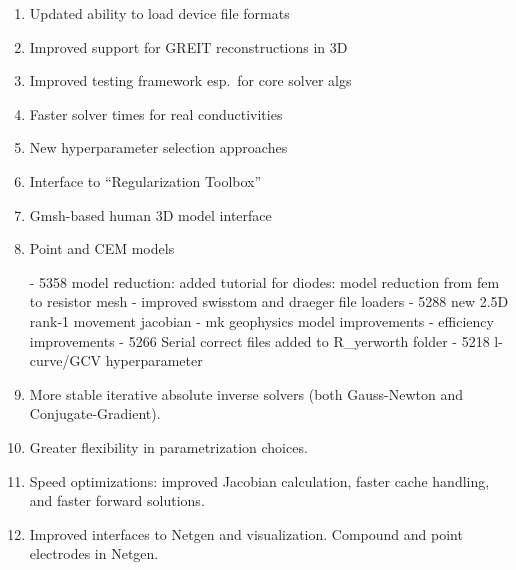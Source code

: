 \documentclass[10pt,a4paper]{article}
\begin{document}
\begin{multicols}{2}
\begin{enumerate}
\item Updated ability to load device file formats

\item Improved support for GREIT reconstructions in 3D

\item Improved testing framework esp.\ for core solver algs

\item Faster solver times for real conductivities

\item New hyperparameter selection approaches

\item Interface to ``Regularization Toolbox'' \cite{Hansen}

\item Gmsh-based human 3D model interface

\item Point and CEM models

  - 5358 model reduction: added tutorial for diodes: model reduction from fem to resistor mesh
  - improved swisstom and draeger file loaders
  - 5288 new 2.5D rank-1 movement jacobian
  - mk geophysics model improvements
  - efficiency improvements
  - 5266 Serial correct files added to R_yerworth folder
  - 5218 l-curve/GCV hyperparameter

\item More stable
  iterative absolute inverse solvers (both Gauss-Newton and
  Conjugate-Gradient).

\item Greater flexibility in parametrization choices.


\item Speed optimizations: improved Jacobian calculation, faster cache handling, and 
  faster forward solutions.


\item Improved interfaces to Netgen and visualization.
      Compound and point electrodes in Netgen.


\end{enumerate}
\end{multicols}
\end{document}
